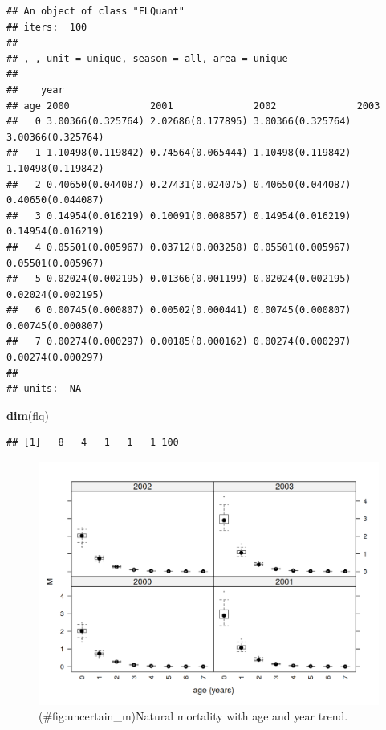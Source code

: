 \documentclass[
]{book}
\newenvironment{Shaded}{\begin{snugshade}}{\end{snugshade}}
\newcommand{\FunctionTok}[1]{\textcolor[rgb]{0.13,0.29,0.53}{\textbf{#1}}}
\newcommand{\NormalTok}[1]{#1}
\begin{document}
\begin{verbatim}
## An object of class "FLQuant"
## iters:  100 
## 
## , , unit = unique, season = all, area = unique
## 
##    year
## age 2000              2001              2002              2003             
##   0 3.00366(0.325764) 2.02686(0.177895) 3.00366(0.325764) 3.00366(0.325764)
##   1 1.10498(0.119842) 0.74564(0.065444) 1.10498(0.119842) 1.10498(0.119842)
##   2 0.40650(0.044087) 0.27431(0.024075) 0.40650(0.044087) 0.40650(0.044087)
##   3 0.14954(0.016219) 0.10091(0.008857) 0.14954(0.016219) 0.14954(0.016219)
##   4 0.05501(0.005967) 0.03712(0.003258) 0.05501(0.005967) 0.05501(0.005967)
##   5 0.02024(0.002195) 0.01366(0.001199) 0.02024(0.002195) 0.02024(0.002195)
##   6 0.00745(0.000807) 0.00502(0.000441) 0.00745(0.000807) 0.00745(0.000807)
##   7 0.00274(0.000297) 0.00185(0.000162) 0.00274(0.000297) 0.00274(0.000297)
## 
## units:  NA
\end{verbatim}

\begin{Shaded}
\begin{Highlighting}[]
\FunctionTok{dim}\NormalTok{(flq)}
\end{Highlighting}
\end{Shaded}

\begin{verbatim}
## [1]   8   4   1   1   1 100
\end{verbatim}

\begin{figure}
\centering
\includegraphics{_bookdown_files/_main_files/figure-html/uncertain_m-1.png}
\caption{(\#fig:uncertain\_m)Natural mortality with age and year trend.}
\end{figure}
\end{document}
